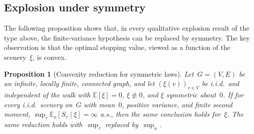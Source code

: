 \documentclass[aop]{imsart}
\theoremstyle{plain}
\newtheorem{proposition}[theorem]{Proposition}
\theoremstyle{definition}
\newcommand{\E}{\mathbb{E}}
\begin{document}
	\subsection{Explosion under symmetry}
	
	The following proposition shows that, in every qualitative explosion result of the type above, the finite-variance hypothesis can be replaced by symmetry.  The key observation is that the optimal stopping value, viewed as a function of the scenery~$\xi$, is convex.
	
	\begin{proposition}[Convexity reduction for symmetric laws]\label{prop:convexity-reduction}
		Let~$G = (V,E)$ be an infinite, locally finite, connected graph, and let $(\xi(v))_{v\in V}$ be i.i.d.\ and independent of the walk with
		$\E[\xi]=0$, $\xi\not\equiv 0$, and $\xi$ symmetric about~$0$.
		If for every i.i.d.\ scenery on~$G$ with mean~$0$, positive variance, and finite second moment, $\sup_\tau\E_o[S_\tau\mid\xi]=\infty$ a.s., then the same conclusion holds for~$\xi$. The same reduction holds with~$\sup_\tau$ replaced by~$\sup_n$.
	\end{proposition}
	
\end{document}
